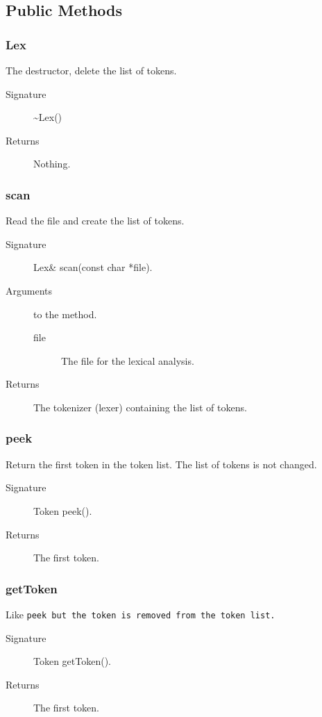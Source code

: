 \subsection{Public Methods}

\subsubsection{Lex}

The destructor, delete the list of tokens.
\begin{description}
  \item [Signature] \~{ }Lex()
  \item [Returns]  Nothing.
\end{description}

\subsubsection{scan}
Read the file and create the list of tokens. 
\begin{description}
   \item [Signature] Lex\& scan(const char *file).
   \item [Arguments] to the method.
     \begin{description}
        \item [file] The file for the lexical analysis.
     \end{description} 
  \item [Returns] The tokenizer (lexer) containing the list of tokens.
\end{description}

\subsubsection{peek}
Return the first token in the token list. The list of tokens  is not
changed.
\begin{description}
  \item [Signature] Token peek().
  \item [Returns] The first token.
\end{description}

\subsubsection{getToken}
Like \tt peek \rm but the token is removed from the token list. 
\begin{description}
  \item [Signature] Token getToken().
  \item [Returns] The first token.
\end{description}


